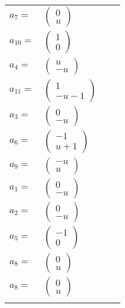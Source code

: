 \documentclass[1p]{elsarticle_modified}
\theoremstyle{definition}
\begin{document}
\begin{tabular}{m{7pt} m{180pt} m{7pt} m{180pt} }
\flushright $a_{7}=$&$\begin{pmatrix}0\\u\end{pmatrix}$ \\
\flushright $a_{10}=$&$\begin{pmatrix}1\\0\end{pmatrix}$ \\
\flushright $a_{4}=$&$\begin{pmatrix}u\\- u\end{pmatrix}$ \\
\flushright $a_{11}=$&$\begin{pmatrix}1\\- u-1\end{pmatrix}$ \\
\flushright $a_{3}=$&$\begin{pmatrix}0\\- u\end{pmatrix}$ \\
\flushright $a_{6}=$&$\begin{pmatrix}-1\\u+1\end{pmatrix}$ \\
\flushright $a_{9}=$&$\begin{pmatrix}- u\\u\end{pmatrix}$ \\
\flushright $a_{1}=$&$\begin{pmatrix}0\\- u\end{pmatrix}$ \\
\flushright $a_{2}=$&$\begin{pmatrix}0\\- u\end{pmatrix}$ \\
\flushright $a_{5}=$&$\begin{pmatrix}-1\\0\end{pmatrix}$ \\
\flushright $a_{8}=$&$\begin{pmatrix}0\\u\end{pmatrix}$\\ \flushright $a_{8}=$&$\begin{pmatrix}0\\u\end{pmatrix}$\\&\end{tabular}
\end{document}
